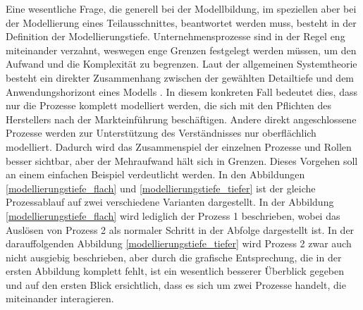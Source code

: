 \documentclass[a4paper,12pt]{report}
\begin{document}
Eine wesentliche Frage, die generell bei der Modellbildung, im speziellen aber bei der Modellierung eines Teilausschnittes, beantwortet werden muss, besteht in der Definition der Modellierungstiefe. Unternehmensprozesse sind in der Regel eng miteinander verzahnt, weswegen enge Grenzen festgelegt werden müssen, um den Aufwand und die Komplexität zu begrenzen. Laut der allgemeinen Systemtheorie besteht ein direkter Zusammenhang zwischen der gewählten Detailtiefe und dem Anwendungshorizont eines Modells \citep[vgl.][S. 49f]{Morecroft2009}. In diesem konkreten Fall bedeutet dies, dass nur die Prozesse komplett modelliert werden, die sich mit den Pflichten des Herstellers nach der Markteinführung beschäftigen. Andere direkt angeschlossene Prozesse werden zur Unterstützung des Verständnisses nur oberflächlich modelliert. Dadurch wird das Zusammenspiel der einzelnen Prozesse und Rollen besser sichtbar, aber der Mehraufwand hält sich in Grenzen. Dieses Vorgehen soll an einem einfachen Beispiel verdeutlicht werden. In den Abbildungen \ref{modellierungstiefe_flach} und \ref{modellierungstiefe_tiefer} ist der gleiche Prozessablauf auf zwei verschiedene Varianten dargestellt. In der Abbildung \ref{modellierungstiefe_flach} wird lediglich der Prozess 1 beschrieben, wobei das Auslösen von Prozess 2 als normaler Schritt in der Abfolge dargestellt ist. In der darauffolgenden Abbildung \ref{modellierungstiefe_tiefer} wird Prozess 2 zwar auch nicht ausgiebig beschrieben, aber durch die grafische Entsprechung, die in der ersten Abbildung komplett fehlt, ist ein wesentlich besserer Überblick gegeben und auf den ersten Blick ersichtlich, dass es sich um zwei Prozesse handelt, die miteinander interagieren.
\end{document}
